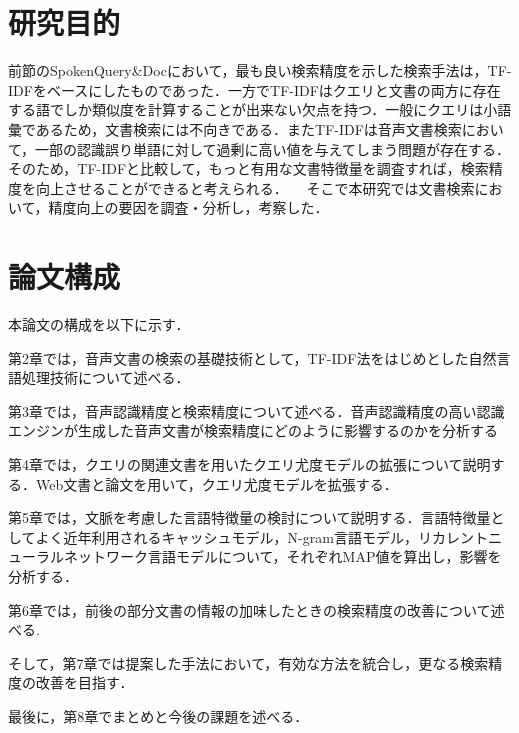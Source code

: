 \section{研究目的}
前節のSpokenQuery\&Docにおいて，最も良い検索精度を示した検索手法は，TF-IDFをベースにしたものであった．一方でTF-IDFはクエリと文書の両方に存在する語でしか類似度を計算することが出来ない欠点を持つ．一般にクエリは小語彙であるため，文書検索には不向きである．またTF-IDFは音声文書検索において，一部の認識誤り単語に対して過剰に高い値を与えてしまう問題が存在する．そのため，TF-IDFと比較して，もっと有用な文書特徴量を調査すれば，検索精度を向上させることができると考えられる．
　そこで本研究では文書検索において，精度向上の要因を調査・分析し，考察した．

\section{論文構成}
\noindent
本論文の構成を以下に示す．

第2章では，音声文書の検索の基礎技術として，TF-IDF法をはじめとした自然言語処理技術について述べる．

第3章では，音声認識精度と検索精度について述べる．音声認識精度の高い認識エンジンが生成した音声文書が検索精度にどのように影響するのかを分析する 

第4章では，クエリの関連文書を用いたクエリ尤度モデルの拡張について説明する．Web文書と論文を用いて，クエリ尤度モデルを拡張する．

第5章では，文脈を考慮した言語特徴量の検討について説明する．言語特徴量としてよく近年利用されるキャッシュモデル，N-gram言語モデル，リカレントニューラルネットワーク言語モデルについて，それぞれMAP値を算出し，影響を分析する．

第6章では，前後の部分文書の情報の加味したときの検索精度の改善について述べる. 

そして，第7章では提案した手法において，有効な方法を統合し，更なる検索精度の改善を目指す． 

最後に，第8章でまとめと今後の課題を述べる．

